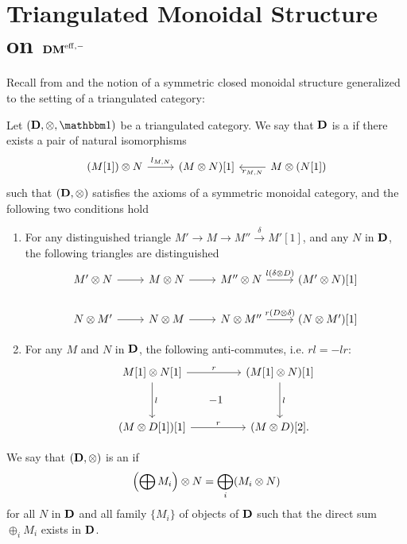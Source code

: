 \section{Triangulated Monoidal Structure on $\DMeff$}
\label{sect_TMS_DMeff}

Recall from \cite[1.13]{MK} and \cite[8A.1]{MVW} the notion of a 
symmetric closed monoidal structure generalized to the setting of 
a triangulated category:

\begin{defn}\label{def_tensor_triang_cat}
Let $(\DCat, \tensor, \Unit)$ be a triangulated category. We say that $\DCat$ 
is a  if there exists a pair of
natural isomorphisms 
\[
\begin{tikzcd}
(M[1]) \tensor N \arrow{r}{l_{M, N}}&
(M \tensor N)[1] &
M \tensor (N[1]) \arrow{l}{r_{M, N}}
\end{tikzcd}
\]
such that $(\DCat[D], \tensor)$ satisfies the axioms of a 
symmetric monoidal category, and the following two conditions
hold
\begin{enumerate}
\item For any distinguished triangle $M' \to M \to M'' 
\stackrel{\delta}{\to} M'[1]$, and any $N$ in $\DCat[D]$,
the following triangles are distinguished
\[
\begin{tikzcd}
M' \tensor N \arrow{r} &
M \tensor N \arrow{r} &
M'' \tensor N \arrow{r}{l(\delta \tensor D)}&
(M' \tensor N)[1] \\
N \tensor M' \arrow{r} &
N \tensor M \arrow{r} &
N \tensor M'' \arrow{r}{r(D \tensor \delta)}&
(N \tensor M')[1]
\end{tikzcd}
\]

\item For any $M$ and $N$ in $\DCat[D]$, the following 
anti-commutes, i.e. $rl = -lr$:
\[
\begin{tikzcd}[row sep=small, column sep=small]
M[1] \tensor N[1] \arrow{rr}{r}\arrow{dd}{l} && 
(M[1] \tensor N)[1] \arrow{dd}{l} \\
& -1 \\
(M \tensor D[1])[1] \arrow{rr}{r} &&
(M \tensor D)[2].
\end{tikzcd}
\]
\end{enumerate}

We say that $(\DCat, \tensor)$ is an  if 
\[
\left(\bigoplus M_i\right) \tensor N = \bigoplus_i (M_i \tensor N)
\]
for all $N$ in $\DCat$ and all family $\{M_i\}$ of objects of 
$\DCat$ such that the direct sum $\oplus_i M_i$ exists in $\DCat$. 
\end{defn}

